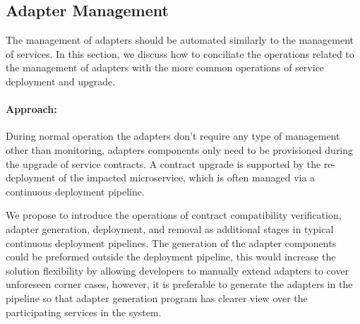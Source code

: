 \subsection{Adapter Management} %
\label{sec:adapter_management}

The management of adapters should be automated similarly to the management of services.
In this section, we discuss how to conciliate the operations related to the management of adapters with the more common operations of service deployment and upgrade.

\paragraph{Approach:}
During normal operation the adapters don't require any type of management other than monitoring,
adapters components only need to be provisioned during the upgrade of service contracts.
A contract upgrade is supported by the re-deployment of the impacted microservice, which is often managed via a continuous deployment pipeline.

We propose to introduce the operations of contract compatibility verification, adapter generation, deployment,
and removal as additional stages in typical continuous deployment pipelines.
The generation of the adapter components could be preformed outside the deployment pipeline,
this would increase the solution flexibility by allowing developers to manually extend adapters to cover unforeseen corner cases,
however, it is preferable to generate the adapters in the pipeline so that adapter generation program has clearer view
over the participating services in the system.
